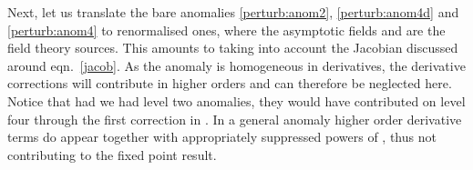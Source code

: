 \documentclass[a4paper,12pt]{article}
\begin{document}
Next, let us translate the bare anomalies
\eqref{perturb:anom2}, \eqref{perturb:anom4d} and
\eqref{perturb:anom4} to renormalised ones, where the asymptotic
fields \coordHE{} and \myHighlight{$\hat{\phi}$}\coordHE{} are the field theory
sources.
This amounts to taking into account the Jacobian \coordHE{} discussed 
around eqn.\ \eqref{jacob}. As the anomaly is homogeneous in derivatives, the
derivative corrections will contribute in higher orders and can therefore 
be neglected
here. Notice that had we had level two 
anomalies, they 
would have contributed  on level four through the first correction in 
\coordHE{}. 
In a general anomaly higher order derivative terms do appear 
together with appropriately suppressed powers of \coordHE{}, thus not 
contributing to the fixed point result.    
\end{document}
